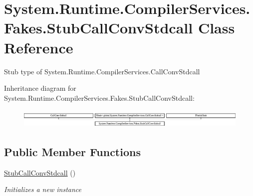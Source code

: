 \hypertarget{class_system_1_1_runtime_1_1_compiler_services_1_1_fakes_1_1_stub_call_conv_stdcall}{\section{System.\-Runtime.\-Compiler\-Services.\-Fakes.\-Stub\-Call\-Conv\-Stdcall Class Reference}
\label{class_system_1_1_runtime_1_1_compiler_services_1_1_fakes_1_1_stub_call_conv_stdcall}
}


Stub type of System.\-Runtime.\-Compiler\-Services.\-Call\-Conv\-Stdcall 


Inheritance diagram for System.\-Runtime.\-Compiler\-Services.\-Fakes.\-Stub\-Call\-Conv\-Stdcall\-:\begin{figure}[H]
\begin{center}
\leavevmode
\includegraphics[height=0.942761cm]{class_system_1_1_runtime_1_1_compiler_services_1_1_fakes_1_1_stub_call_conv_stdcall}
\end{center}
\end{figure}
\subsection*{Public Member Functions}
\begin{DoxyCompactItemize}
\item 
\hyperlink{class_system_1_1_runtime_1_1_compiler_services_1_1_fakes_1_1_stub_call_conv_stdcall_a7db4e3284d07a8d9fe4af209a0a8511d}{Stub\-Call\-Conv\-Stdcall} ()
\begin{DoxyCompactList}\small\item\em Initializes a new instance\end{DoxyCompactList}\end{DoxyCompactItemize}
